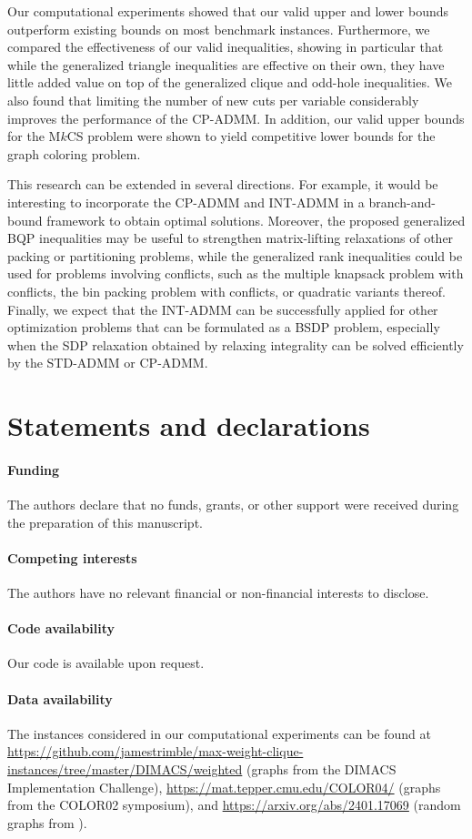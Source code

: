\documentclass[11pt, a4paper]{article}
\begin{document}
Our computational experiments showed that our valid upper and lower bounds outperform existing bounds on most benchmark instances.
Furthermore, we compared the effectiveness of our valid inequalities, showing in particular that while the generalized triangle inequalities are effective on their own, they have little added value on top of the generalized clique and odd-hole inequalities. 
We also found that limiting the number of new cuts per variable considerably improves the performance of the CP-ADMM. 
In addition, our valid upper bounds for the M$k$CS problem were shown to yield competitive lower bounds for the graph coloring problem.

This research can be extended in several directions.
For example, it would be interesting to incorporate the CP-ADMM and INT-ADMM in a branch-and-bound framework to obtain optimal solutions.
Moreover, the proposed generalized BQP inequalities may be useful to strengthen matrix-lifting relaxations of other packing or partitioning problems, while the generalized rank inequalities could be used for problems involving conflicts, such as the multiple knapsack problem with conflicts, the bin packing problem with conflicts, or quadratic variants thereof.
Finally, we expect that the INT-ADMM can be successfully applied for other optimization problems that can be formulated as a BSDP problem, especially when the SDP relaxation obtained by relaxing integrality can be solved efficiently by the STD-ADMM or CP-ADMM. 




\section*{Statements and declarations}
\paragraph{Funding} The authors declare that no funds, grants, or other support were received during the preparation of this manuscript.
\paragraph{Competing interests} The authors have no relevant financial or non-financial interests to disclose.
\paragraph{Code availability} Our code is available upon request.
\paragraph{Data availability} The instances considered in our computational experiments can be found at 
\url{https://github.com/jamestrimble/max-weight-clique-instances/tree/master/DIMACS/weighted} (graphs from the DIMACS Implementation Challenge),
\url{https://mat.tepper.cmu.edu/COLOR04/} (graphs from the COLOR02 symposium), and 
\url{https://arxiv.org/abs/2401.17069} (random graphs from \citep{Pucher2025PracticalExperience}).
\end{document}
